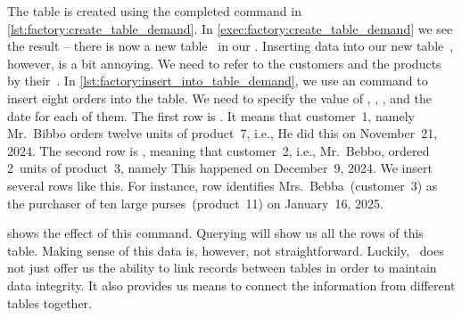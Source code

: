 %
The table is created using the completed command in \cref{lst:factory:create_table_demand}.
In \cref{exec:factory:create_table_demand} we see the result -- there is now a new table~ in our \db.%
%
\endhsection%
%
%
%
%
Inserting data into our new table~, however, is a bit annoying.
We need to refer to the customers and the products by their~.
In \cref{lst:factory:insert_into_table_demand}, we use an  command to insert eight orders into the table.
We need to specify the value of , , , and the  date for each of them.
The first row is .
It means that customer~1, namely Mr.~Bibbo orders twelve units of product~7, i.e., 
He did this on November~21, 2024.
The second row is , meaning that customer~2, i.e., Mr.~Bebbo, ordered 2~units of product~3, namely 
This happened on December~9, 2024.
We insert several rows like this.
For instance, row  identifies Mrs.~Bebba~(customer~3) as the purchaser of ten large purses~(product~11) on January~16, 2025.

 shows the effect of this command.
Querying  will show us all the rows of this table.
Making sense of this data is, however, not straightforward.
Luckily, \sql\ does not just offer us the ability to link records between tables in order to maintain data integrity.
It also provides us means to connect the information from different tables together.%
%
\endhsection%
\FloatBarrier%
\endhsection%
\endhsection%
%
